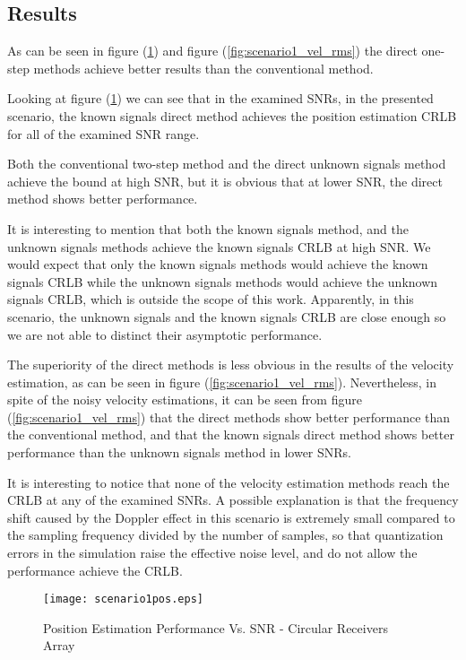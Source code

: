 \subsection*{Results}
As can be seen in figure (\ref{fig:scenario1_pos_rms}) and figure (\ref{fig:scenario1_vel_rms}) the direct one-step methods achieve better results than the conventional method.

Looking at figure (\ref{fig:scenario1_pos_rms}) we can see that in the examined SNRs, in the presented scenario, the known signals direct method achieves the position estimation CRLB for all of the examined SNR range.

Both the conventional two-step method and the direct unknown signals method achieve the bound at high SNR, but it is obvious that at lower SNR, the direct method shows better performance.

It is interesting to mention that both the known signals method, and the unknown signals methods achieve the known signals CRLB at high SNR. We would expect that only the known signals methods would achieve the known signals CRLB while the unknown signals methods would achieve the unknown signals CRLB, which is outside the scope of this work. Apparently, in this scenario, the unknown signals and the known signals CRLB are close enough so we are not able to distinct their asymptotic performance.

The superiority of the direct methods is less obvious in the results of the velocity estimation, as can be seen in figure (\ref{fig:scenario1_vel_rms}). Nevertheless, in spite of the noisy velocity estimations, it can be seen from figure (\ref{fig:scenario1_vel_rms}) that the direct methods show better performance than the conventional method, and that the known signals direct method shows better performance than the unknown signals method in lower SNRs.

It is interesting to notice that none of the velocity estimation methods reach the CRLB at any of the examined SNRs. A possible explanation is that the frequency shift caused by the Doppler effect in this scenario is extremely small compared to the sampling frequency divided by the number of samples, so that quantization errors in the simulation raise the effective noise level, and do not allow the performance achieve the CRLB.



\begin{figure}
\begin{center}
\texttt{[image: scenario1pos.eps]} 
\end{center}
\caption{Position Estimation Performance Vs. SNR - Circular Receivers Array}
\label{fig:scenario1_pos_rms}
\end{figure}

